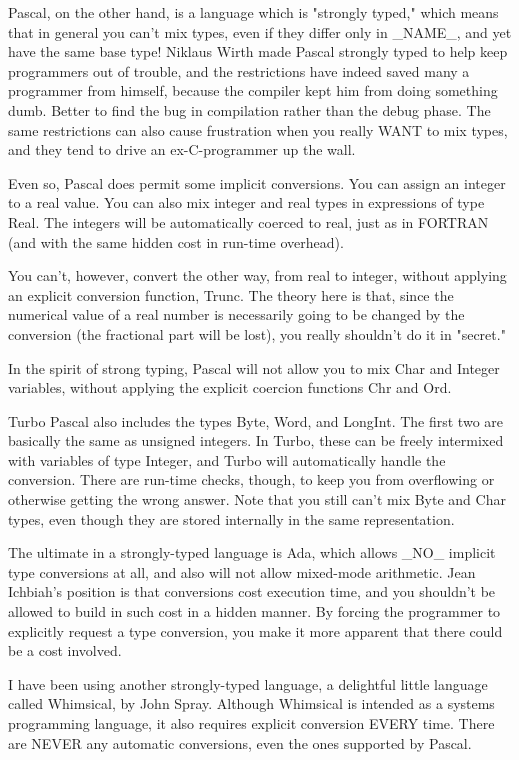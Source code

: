\documentclass[float=false, crop=false]{standalone}
\begin{document}
Pascal, on the other hand, is a language which is "strongly typed," which means
that in general you can't mix types, even if they differ only in _NAME_, and yet
have the same base type! Niklaus Wirth made Pascal strongly typed to help keep
programmers out of trouble, and the restrictions have indeed saved many a
programmer from himself, because the compiler kept him from doing something
dumb. Better to find the bug in compilation rather than the debug phase. The
same restrictions can also cause frustration when you really WANT to mix types,
and they tend to drive an ex-C-programmer up the wall.

Even so, Pascal does permit some implicit conversions. You can assign an integer
to a real value. You can also mix integer and real types in expressions of type
Real. The integers will be automatically coerced to real, just as in FORTRAN
(and with the same hidden cost in run-time overhead).

You can't, however, convert the other way, from real to integer, without
applying an explicit conversion function, Trunc. The theory here is that, since
the numerical value of a real number is necessarily going to be changed by the
conversion (the fractional part will be lost), you really shouldn't do it in
"secret."

In the spirit of strong typing, Pascal will not allow you to mix Char and
Integer variables, without applying the explicit coercion functions Chr and Ord.

Turbo Pascal also includes the types Byte, Word, and LongInt. The first two are
basically the same as unsigned integers. In Turbo, these can be freely
intermixed with variables of type Integer, and Turbo will automatically handle
the conversion. There are run-time checks, though, to keep you from overflowing
or otherwise getting the wrong answer. Note that you still can't mix Byte and
Char types, even though they are stored internally in the same representation.

The ultimate in a strongly-typed language is Ada, which allows _NO_ implicit
type conversions at all, and also will not allow mixed-mode arithmetic. Jean
Ichbiah's position is that conversions cost execution time, and you shouldn't be
allowed to build in such cost in a hidden manner. By forcing the programmer to
explicitly request a type conversion, you make it more apparent that there could
be a cost involved.

I have been using another strongly-typed language, a delightful little language
called Whimsical, by John Spray. Although Whimsical is intended as a systems
programming language, it also requires explicit conversion EVERY time. There are
NEVER any automatic conversions, even the ones supported by Pascal.
\end{document}
